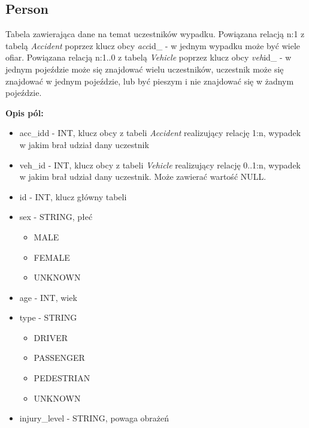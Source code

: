 \subsection{Person}\label{person}

Tabela zawierająca dane na temat uczestników wypadku. Powiązana relacją
n:1 z tabelą \emph{Accident} poprzez klucz obcy \emph{acc}id\_ - w
jednym wypadku może być wiele ofiar. Powiązana relacją n:1..0 z tabelą
\emph{Vehicle} poprzez klucz obcy \emph{veh}id\_ - w jednym pojeździe
może się znajdować wielu uczestników, uczestnik może się znajdować w
jednym pojeździe, lub być pieszym i nie znajdować się w żadnym
pojeździe.

\textbf{Opis pól:}

\begin{itemize}
\item
  acc\_idd - INT, klucz obcy z tabeli \emph{Accident} realizujący
  relację 1:n, wypadek w jakim brał udział dany uczestnik\\
\item
  veh\_id - INT, klucz obcy z tabeli \emph{Vehicle} realizujący relację
  0..1:n, wypadek w jakim brał udział dany uczestnik. Może zawierać
  wartość NULL.\\
\item
  id - INT, klucz główny tabeli\\
\item
  sex - STRING, płeć

  \begin{itemize}
  \itemsep-14pt\parskip0pt
  \item
    MALE\\
  \item
    FEMALE\\
  \item
    UNKNOWN\\
  \end{itemize}
\item
  age - INT, wiek\\
\item
  type - STRING

  \begin{itemize}
  \itemsep-14pt\parskip0pt
  \item
    DRIVER\\
  \item
    PASSENGER\\
  \item
    PEDESTRIAN\\
  \item
    UNKNOWN\\
  \end{itemize}
\item
  injury\_level - STRING, powaga obrażeń


\end{itemize}
